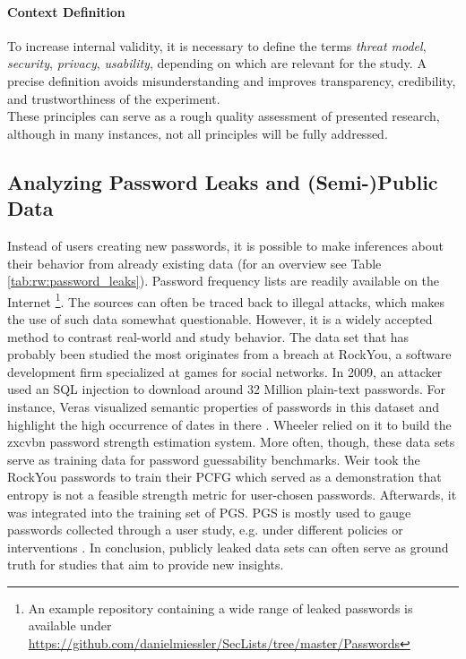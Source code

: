 \paragraph{Context Definition} To increase internal validity, it is necessary to define the terms \textit{threat model}, \textit{security}, \textit{privacy}, \textit{usability}, depending on which are relevant for the study. A precise definition avoids misunderstanding and improves transparency, credibility, and trustworthiness of the experiment.\\ 

\noindent These principles can serve as a rough quality assessment of presented research, although in many instances, not all principles will be fully addressed.

\subsection{Analyzing Password Leaks and (Semi-)Public Data}
Instead of users creating new passwords, it is possible to make inferences about their behavior from already existing data (for an overview see Table \ref{tab:rw:password_leaks}). Password frequency lists are readily available on the Internet \footnote{An example repository containing a wide range of leaked passwords is available under \url{https://github.com/danielmiessler/SecLists/tree/master/Passwords} }. The sources can often be traced back to illegal attacks, which makes the use of such data somewhat questionable. However, it is a widely accepted method to contrast real-world and study behavior. The data set that has probably been studied the most originates from a breach at RockYou, a software development firm specialized at games for social networks. In 2009, an attacker used an SQL injection to download around 32 Million plain-text passwords. For instance, Veras \etal visualized semantic properties of passwords in this dataset and highlight the high occurrence of dates in there \cite{Veras2012VisualizingSemanticsPasswords}. Wheeler relied on it to build the zxcvbn password strength estimation system. More often, though, these data sets serve as training data for password guessability benchmarks. Weir \etal took the RockYou passwords to train their \gls{PCFG} which served as a demonstration that entropy is not a feasible strength metric for user-chosen passwords. Afterwards, it was integrated into the training set of \gls{PGS}. \gls{PGS} is mostly used to gauge passwords collected through a user study, e.g. under different policies \cite{Shay2016DesigningPasswordPolicies} or interventions \cite{Ur2017DataDrivenPWMeter}. In conclusion, publicly leaked data sets can often serve as ground truth for studies that aim to provide new insights.  

